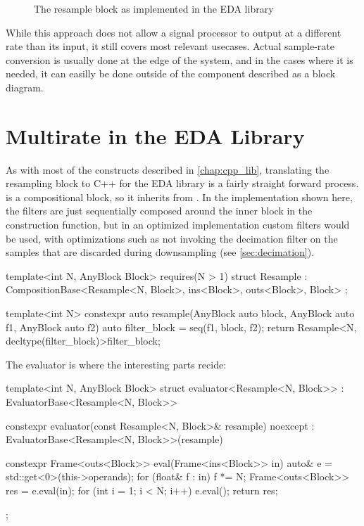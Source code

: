 \begin{figure}
  \centering
  \label{fig:block_resample}
  
  \caption{The resample block as implemented in the EDA library}
\end{figure}

While this approach does not allow a signal processor to output at a different rate than its input, it still
covers most relevant usecases. Actual sample-rate conversion is usually done at the edge of the system, and
in the cases where it is needed, it can easilly be done outside of the component described as a block
diagram.

\section{Multirate in the EDA Library}
\label{sec:multirate_eda}

As with most of the constructs described in \autoref{chap:cpp_lib}, translating the resampling block to C++
for the EDA library is a fairly straight forward process. \Resample is a compositional block, so it inherits
from . In the implementation shown here, the filters are just sequentially composed
around the inner block in the construction function, but in an optimized implementation custom filters would
be used, with optimizations such as not invoking the decimation filter on the samples that are discarded
during downsampling (see \autoref{sec:decimation}).

\begin{cppcodenl}
  template<int N, AnyBlock Block>
  requires(N > 1)
  struct Resample : CompositionBase<Resample<N, Block>, ins<Block>, outs<Block>, Block> {};

  template<int N>
  constexpr auto resample(AnyBlock auto block, AnyBlock auto f1, AnyBlock auto f2)
  {
    auto filter_block = seq(f1, block, f2);
    return Resample<N, decltype(filter_block)>{{filter_block}};
  }
\end{cppcodenl}

The evaluator is where the interesting parts recide:

\begin{cppcode}
  template<int N, AnyBlock Block>
  struct evaluator<Resample<N, Block>> : EvaluatorBase<Resample<N, Block>> {
    constexpr evaluator(const Resample<N, Block>& resample) noexcept 
      : EvaluatorBase<Resample<N, Block>>(resample) 
    {}

    constexpr Frame<outs<Block>> eval(Frame<ins<Block>> in)
    {
      auto& e = std::get<0>(this->operands);
      for (float& f : in) {
        f *= N;
      }
      Frame<outs<Block>> res = e.eval(in);
      for (int i = 1; i < N; i++) {
        e.eval({});
      }
      return res; }
  };
\end{cppcode}

